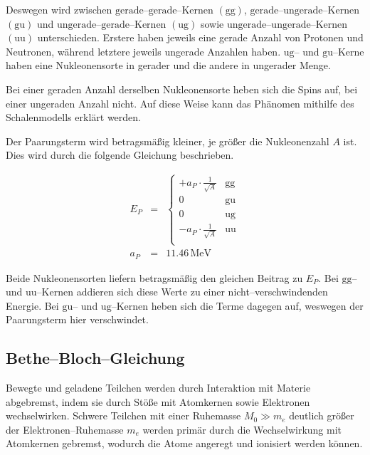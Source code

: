 \documentclass[12pt,a4paper]{scrartcl}
\numberwithin{equation}{section} %
\begin{document}
Deswegen wird zwischen $\mathrm{gerade}$--$\mathrm{gerade}$--Kernen $(\mathrm{gg})$, $\mathrm{gerade}$--$\mathrm{ungerade}$--Kernen $(\mathrm{gu})$ und $\mathrm{ungerade}$--$\mathrm{gerade}$--Kernen $(\mathrm{ug})$ sowie $\mathrm{ungerade}$--$\mathrm{ungerade}$--Kernen $(\mathrm{uu})$ unterschieden. Erstere haben jeweils eine gerade Anzahl von Protonen und Neutronen, während letztere jeweils ungerade Anzahlen haben. $\mathrm{ug}$-- und $\mathrm{gu}$--Kerne haben eine Nukleonensorte in gerader und die andere in ungerader Menge.

Bei einer geraden Anzahl derselben Nukleonensorte heben sich die Spins auf, bei einer ungeraden Anzahl nicht. Auf diese Weise kann das Phänomen mithilfe des Schalenmodells erklärt werden.

Der Paarungsterm wird betragsmäßig kleiner, je größer die Nukleonenzahl $A$ ist. Dies wird durch die folgende Gleichung beschrieben.

\begin{eqnarray}
    E_P &=&
        \begin{cases}
            + a_P\cdot \frac{1}{\sqrt{A}} & \text{gg} \\
            0 & \text{gu} \\
            0 & \text{ug} \\
            - a_P\cdot \frac{1}{\sqrt{A}} & \text{uu} \\
        \end{cases}
        \label{Paarungsterm} \\
    a_P &=& 11.46\mathrm{\,MeV}
\end{eqnarray}

\noindent
Beide Nukleonensorten liefern betragsmäßig den gleichen Beitrag zu $E_P$. Bei $\mathrm{gg}$-- und $\mathrm{uu}$--Kernen addieren sich diese Werte zu einer nicht--verschwindenden Energie. Bei $\mathrm{gu}$-- und $\mathrm{ug}$--Kernen heben sich die Terme dagegen auf, weswegen der Paarungsterm hier verschwindet.

\hypertarget{bethe-bloch-gleichung}{%
\subsection{Bethe--Bloch--Gleichung}\label{bethe-bloch-gleichung}}

Bewegte und geladene Teilchen werden durch Interaktion mit Materie abgebremst, indem sie durch Stöße mit Atomkernen sowie Elektronen wechselwirken. Schwere Teilchen mit einer Ruhemasse $M_0\gg m_e$ deutlich größer der Elektronen--Ruhemasse $m_e$ werden primär durch die Wechselwirkung mit Atomkernen gebremst, wodurch die Atome angeregt und ionisiert werden können.
\end{document}

